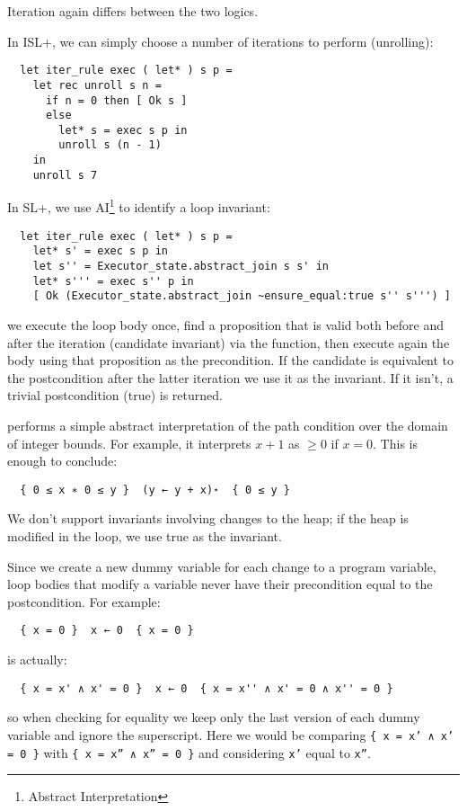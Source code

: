 \documentclass[parskip=half]{scrartcl}
\begin{document}
Iteration again differs between the two logics.

In ISL+, we can simply choose a number of iterations to perform (unrolling):
\begin{verbatim}
  let iter_rule exec ( let* ) s p =
    let rec unroll s n =
      if n = 0 then [ Ok s ]
      else
        let* s = exec s p in
        unroll s (n - 1)
    in
    unroll s 7
\end{verbatim}

In SL+, we use AI\footnote{Abstract Interpretation} to identify a loop invariant:
\begin{verbatim}
  let iter_rule exec ( let* ) s p =
    let* s' = exec s p in
    let s'' = Executor_state.abstract_join s s' in
    let* s''' = exec s'' p in
    [ Ok (Executor_state.abstract_join ~ensure_equal:true s'' s''') ]
\end{verbatim}
we execute the loop body once, find a proposition that is valid both before and after the iteration (candidate invariant) via the  function, then execute again the body using that proposition as the precondition. If the candidate is equivalent to the postcondition after the latter iteration we use it as the invariant. If it isn't, a trivial postcondition (true) is returned.

 performs a simple abstract interpretation of the path condition over the domain of integer bounds. For example, it interprets \(x + 1\) as \(\geq 0\) if \(x = 0\). This is enough to conclude:
\begin{verbatim}
  { 0 ≤ x ∗ 0 ≤ y }  (y ← y + x)⋆  { 0 ≤ y }
\end{verbatim}

We don't support invariants involving changes to the heap; if the heap is modified in the loop, we use true as the invariant.

Since we create a new dummy variable for each change to a program variable, loop bodies that modify a variable never have their precondition equal to the postcondition. For example:
\begin{verbatim}
  { x = 0 }  x ← 0  { x = 0 }
\end{verbatim}
is actually:
\begin{verbatim}
  { x = x' ∧ x' = 0 }  x ← 0  { x = x'' ∧ x' = 0 ∧ x'' = 0 }
\end{verbatim}
so when checking for equality we keep only the last version of each dummy variable and ignore the superscript. Here we would be comparing \texttt{\{ x = x' ∧ x' = 0 \}} with \texttt{\{ x = x'' ∧ x'' = 0 \}} and considering \texttt{x'} equal to \texttt{x''}.
\end{document}
